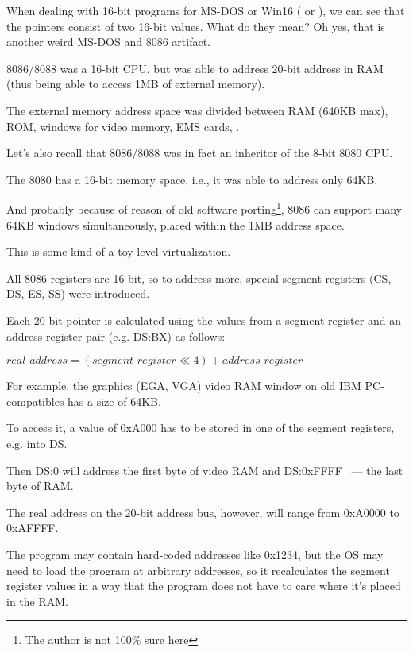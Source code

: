 \label{8086_memory_model}

When dealing with 16-bit programs for MS-DOS or Win16
( or ),
we can see that the pointers consist of two 16-bit values.
What do they mean? Oh yes, that is another weird MS-DOS and 8086 artifact.

8086/8088 was a 16-bit CPU, but was able to address 20-bit address in RAM 
(thus being able to access 1MB of external memory).

The external memory address space was divided between \ac{RAM} (640KB max),
\ac{ROM}, windows for video memory, EMS cards, \etc{}.

Let's also recall that 8086/8088 was in fact an inheritor of the 8-bit 8080 CPU.

The 8080 has a 16-bit memory space, i.e., it was able to address only 64KB.

And probably because of reason of old software porting\footnote{The author is not 100\% sure here},
8086 can support many 64KB windows simultaneously, placed
within the 1MB address space.

This is some kind of a toy-level virtualization.

All 8086 registers are 16-bit, so to address more, special segment registers (CS, DS, ES, SS) were
introduced.

Each 20-bit pointer is calculated using the values from a segment register and 
an address register pair (e.g. DS:BX) as follows:

\begin{center}
$real\_address = (segment\_register \ll 4) + address\_register$
\end{center}

For example, the graphics (\ac{EGA}, \ac{VGA}) video \ac{RAM} window on old IBM PC-compatibles 
has a size of 64KB.

To access it, a value of 0xA000 has to be stored in one of the segment registers, e.g. into DS.

Then DS:0 will address the first byte of video \ac{RAM} and DS:0xFFFF ~--- the last byte of RAM.

The real address on the 20-bit address bus, however, will range from 0xA0000 to 0xAFFFF.

The program may contain hard-coded addresses like 0x1234, but the \ac{OS} may need to load the program at arbitrary
addresses, so it recalculates the segment register values in a way that the program does not have to care 
where it's placed in the RAM.

